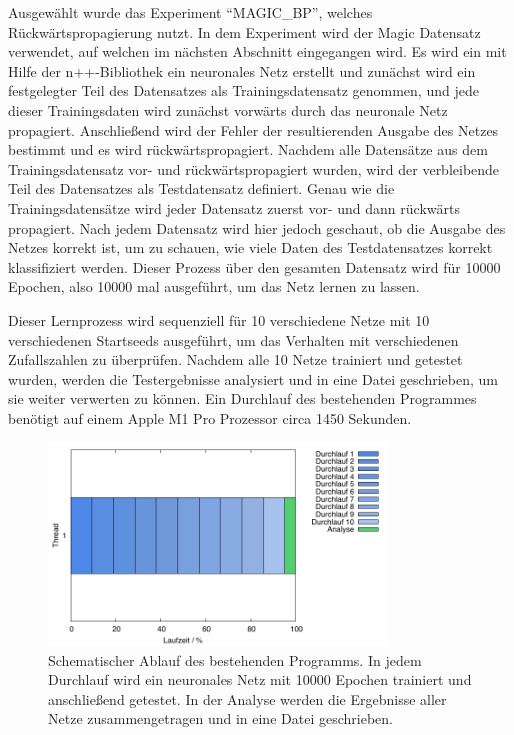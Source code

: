 Ausgewählt wurde das Experiment \enquote{MAGIC\_BP}, welches Rückwärtspropagierung nutzt. In dem Experiment wird der Magic Datensatz verwendet, auf welchen im nächsten Abschnitt eingegangen wird. Es wird ein mit Hilfe der n++-Bibliothek ein neuronales Netz erstellt und zunächst wird ein festgelegter Teil des Datensatzes als Trainingsdatensatz genommen, und jede dieser Trainingsdaten wird zunächst vorwärts durch das neuronale Netz propagiert. Anschließend wird der Fehler der resultierenden Ausgabe des Netzes bestimmt und es wird rückwärtspropagiert.
Nachdem alle Datensätze aus dem Trainingsdatensatz vor- und rückwärtspropagiert wurden, wird der verbleibende Teil des Datensatzes als Testdatensatz definiert. Genau wie die Trainingsdatensätze wird jeder Datensatz zuerst vor- und dann rückwärts propagiert. Nach jedem Datensatz wird hier jedoch geschaut, ob die Ausgabe des Netzes korrekt ist, um zu schauen, wie viele Daten des Testdatensatzes korrekt klassifiziert werden.
Dieser Prozess über den gesamten Datensatz wird für 10000 Epochen, also 10000 mal ausgeführt, um das Netz lernen zu lassen.

Dieser Lernprozess wird sequenziell für 10 verschiedene Netze mit 10 verschiedenen Startseeds ausgeführt, um das Verhalten mit verschiedenen Zufallszahlen zu überprüfen. Nachdem alle 10 Netze trainiert und getestet wurden, werden die Testergebnisse analysiert und in eine Datei geschrieben, um sie weiter verwerten zu können. Ein Durchlauf des bestehenden Programmes benötigt auf einem Apple M1 Pro Prozessor circa 1450 Sekunden.

\begin{figure}[H]
\centering
\includegraphics[width=0.8\textwidth]{../results/plots/timeline/timeline_plot_1thread.pdf}
\caption{Schematischer Ablauf des bestehenden Programms. In jedem Durchlauf wird ein neuronales Netz mit 10000 Epochen trainiert und anschließend getestet. In der Analyse werden die Ergebnisse aller Netze zusammengetragen und in eine Datei geschrieben.}
\label{fig:timeline_existing_code}
\end{figure}

